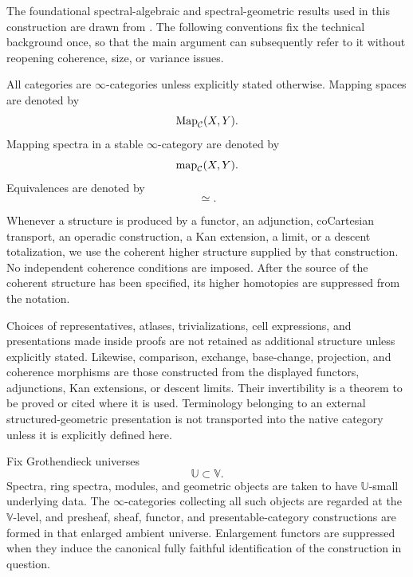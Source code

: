 The foundational spectral-algebraic and spectral-geometric results used in
this construction are drawn from
\cite{LurieHigherAlgebra,LurieSAG,LurieDAGIV,KhanBraveNewMotivicI}. The
following conventions fix the technical background once, so that the main
argument can subsequently refer to it without reopening coherence, size, or
variance issues.
\begin{convention}
\label{conv:spectral-infinity-categorical}
All categories are $\infty$-categories unless explicitly stated otherwise.
Mapping spaces are denoted by
\[
    \operatorname{Map}_{\mathcal C}(X,Y).
\]
Mapping spectra in a stable $\infty$-category are denoted by
\[
    \operatorname{map}_{\mathcal C}(X,Y).
\]
Equivalences are denoted by
\[
    \simeq.
\]
\end{convention}

\begin{convention}
\label{conv:spectral-higher-coherence}
Whenever a structure is produced by a functor, an adjunction, coCartesian
transport, an operadic construction, a Kan extension, a limit, or a descent
totalization, we use the coherent higher structure supplied by that
construction. No independent coherence conditions are imposed. After the
source of the coherent structure has been specified, its higher homotopies are
suppressed from the notation.
\end{convention}

\begin{convention}
\label{conv:spectral-constructed-structure}
Choices of representatives, atlases, trivializations, cell expressions, and
presentations made inside proofs are not retained as additional structure
unless explicitly stated. Likewise, comparison, exchange, base-change,
projection, and coherence morphisms are those constructed from the displayed
functors, adjunctions, Kan extensions, or descent limits. Their invertibility
is a theorem to be proved or cited where it is used. Terminology belonging to
an external structured-geometric presentation is not transported into the
native category unless it is explicitly defined here.
\end{convention}

\begin{convention}[Size]
\label{conv:size-spectral-ag}
Fix Grothendieck universes
\[
    \mathbb U
    \subset
    \mathbb V.
\]
Spectra, ring spectra, modules, and geometric objects are taken to have
\(\mathbb U\)-small underlying data. The \(\infty\)-categories collecting all
such objects are regarded at the \(\mathbb V\)-level, and presheaf, sheaf,
functor, and presentable-category constructions are formed in that enlarged
ambient universe. Enlargement functors are suppressed when they induce the
canonical fully faithful identification of the construction in question.
\end{convention}

